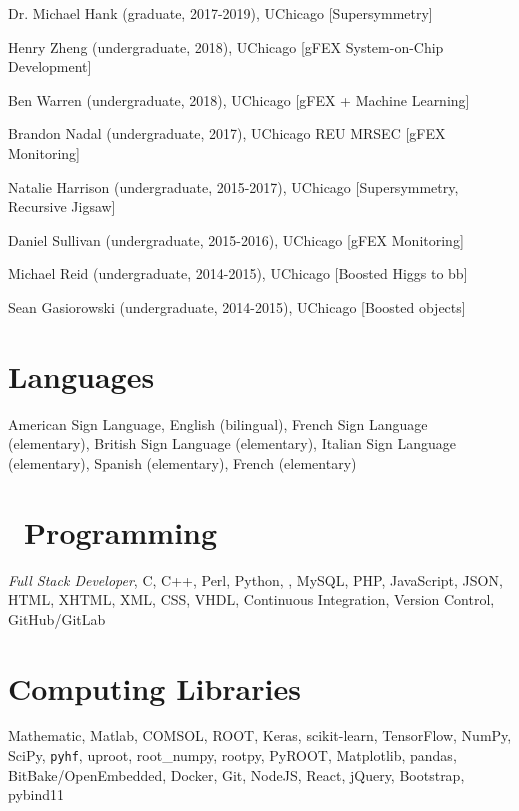\documentclass[margin,line]{resume}
\let\origsection\section%
\let\section\subsection%
\let\section\origsection%
\begin{document}
\begin{resume}
\begin{list2}
  \item Dr. Michael Hank (graduate, 2017-2019), UChicago [Supersymmetry]
  \item Henry Zheng (undergraduate, 2018), UChicago [gFEX System-on-Chip Development]
  \item Ben Warren (undergraduate, 2018), UChicago [gFEX + Machine Learning]
  \item Brandon Nadal (undergraduate, 2017), UChicago REU MRSEC [gFEX Monitoring]
  \item Natalie Harrison (undergraduate, 2015-2017), UChicago [Supersymmetry, Recursive Jigsaw]
  \item Daniel Sullivan (undergraduate, 2015-2016), UChicago [gFEX Monitoring]
  \item Michael Reid (undergraduate, 2014-2015), UChicago [Boosted Higgs to bb]
  \item Sean Gasiorowski (undergraduate, 2014-2015), UChicago [Boosted objects]
\end{list2}

\section{\mysidestyle Languages}

American Sign Language, English (bilingual), French Sign Language (elementary), British Sign Language (elementary), Italian Sign Language (elementary), Spanish (elementary), French (elementary)

\section{\mysidestyle {}~Programming}

\textsl{Full Stack Developer}, C, C++, Perl, Python, \LaTeXe, MySQL, PHP, JavaScript, JSON, HTML, XHTML, XML, CSS, VHDL, Continuous Integration, Version Control, GitHub/GitLab

\section{\mysidestyle Computing Libraries}

Mathematic, Matlab, COMSOL, ROOT, Keras, scikit-learn, TensorFlow, NumPy, SciPy, \texttt{pyhf}, uproot, root\_numpy, rootpy, PyROOT, Matplotlib, pandas, BitBake/OpenEmbedded, Docker, Git, NodeJS, React, jQuery, Bootstrap, pybind11


\end{resume}
\end{document}
